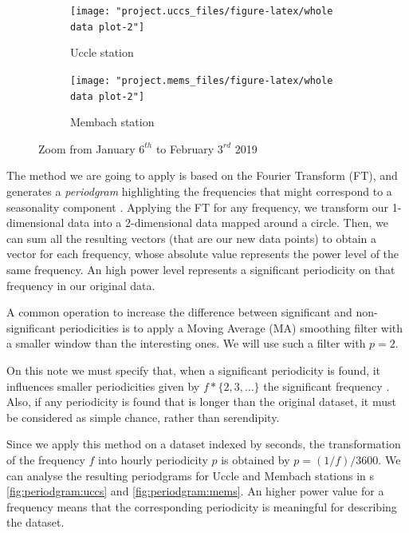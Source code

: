 \documentclass[12pt]{article}
\begin{document}
\begin{figure}[h]
	\begin{subfigure}{.5\linewidth}
		\texttt{[image: "project.uccs\_files/figure-latex/whole data plot-2"]}
		\caption{Uccle station}
		\label{fig:zoom:uccs}
	\end{subfigure}
	\begin{subfigure}{.5\linewidth}
		\texttt{[image: "project.mems\_files/figure-latex/whole data plot-2"]}
		\caption{Membach station}
		\label{fig:zoom:mems}
	\end{subfigure}
	\caption{Zoom from January $6^{th}$ to February $3^{rd}$ 2019}
	\label{fig:zoom}
\end{figure}
%
The method we are going to apply is based on the Fourier Transform (FT), and generates a \textit{periodgram} highlighting the frequencies that might correspond to a seasonality component \cite[chapter 11]{brockwell1991time}.
Applying the FT for any frequency, we transform our 1-dimensional data into a 2-dimensional data mapped around a circle. Then, we can sum all the resulting vectors (that are our new data points) to obtain a vector for each frequency, whose absolute value represents the power level of the same frequency. An high power level represents a significant periodicity on that frequency in our original data.

A common operation to increase the difference between significant and non-significant periodicities is to apply a Moving Average (MA) smoothing filter with a smaller window than the interesting ones. We will use such a filter with $p=2$.

On this note we must specify that, when a significant periodicity is found, it influences smaller periodicities given by $f*\{2,3,\dots\}$ the significant frequency \cite{brockwell1991time}. Also, if any periodicity is found that is longer than the original dataset, it must be considered as simple chance, rather than serendipity.

Since we apply this method on a dataset indexed by seconds, the transformation of the frequency $f$ into hourly periodicity $p$ is obtained by $p=(1/f)/3600$.
We can analyse the resulting periodgrams for Uccle and Membach stations in \figurename{s} \ref{fig:periodgram:uccs} and \ref{fig:periodgram:mems}.
An higher power value for a frequency means that the corresponding periodicity is meaningful for describing the dataset.
\end{document}
